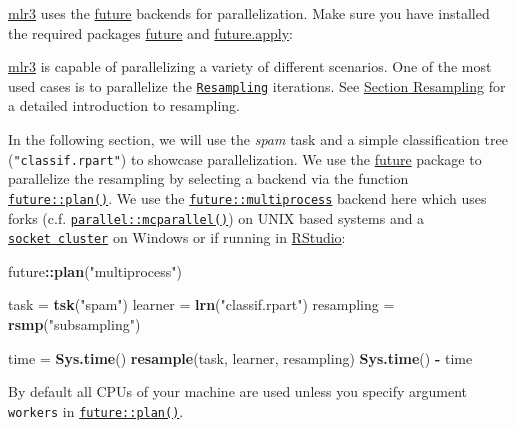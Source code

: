 \documentclass[]{scrbook}
\newenvironment{Shaded}{\begin{snugshade}}{\end{snugshade}}
\newcommand{\KeywordTok}[1]{\textcolor[rgb]{0.13,0.29,0.53}{\textbf{#1}}}
\newcommand{\NormalTok}[1]{#1}
\newcommand{\OperatorTok}[1]{\textcolor[rgb]{0.81,0.36,0.00}{\textbf{#1}}}
\newcommand{\StringTok}[1]{\textcolor[rgb]{0.31,0.60,0.02}{#1}}
\renewenvironment{Shaded} {\begin{snugshade}\small} {\end{snugshade}}
\begin{document}
\href{https://mlr3.mlr-org.com}{mlr3} uses the \href{https://cran.r-project.org/package=future}{future} backends for parallelization.
Make sure you have installed the required packages \href{https://cran.r-project.org/package=future}{future} and \href{https://cran.r-project.org/package=future.apply}{future.apply}:

\href{https://mlr3.mlr-org.com}{mlr3} is capable of parallelizing a variety of different scenarios.
One of the most used cases is to parallelize the \href{https://mlr3.mlr-org.com/reference/Resampling.html}{\texttt{Resampling}} iterations.
See \protect\hyperlink{resampling}{Section Resampling} for a detailed introduction to resampling.

In the following section, we will use the \emph{spam} task and a simple classification tree (\texttt{"classif.rpart"}) to showcase parallelization.
We use the \href{https://cran.r-project.org/package=future}{future} package to parallelize the resampling by selecting a backend via the function \href{https://www.rdocumentation.org/packages/future/topics/plan}{\texttt{future::plan()}}.
We use the \href{https://www.rdocumentation.org/packages/future/topics/multiprocess}{\texttt{future::multiprocess}} backend here which uses forks (c.f. \href{https://www.rdocumentation.org/packages/parallel/topics/mcparallel}{\texttt{parallel::mcparallel()}}) on UNIX based systems and a \href{https://www.rdocumentation.org/packages/parallel/topics/makePSockCluster}{\texttt{socket\ cluster}} on Windows or if running in \href{https://rstudio.com/}{RStudio}:

\begin{Shaded}
\begin{Highlighting}[]
\NormalTok{future}\OperatorTok{::}\KeywordTok{plan}\NormalTok{(}\StringTok{"multiprocess"}\NormalTok{)}

\NormalTok{task =}\StringTok{ }\KeywordTok{tsk}\NormalTok{(}\StringTok{"spam"}\NormalTok{)}
\NormalTok{learner =}\StringTok{ }\KeywordTok{lrn}\NormalTok{(}\StringTok{"classif.rpart"}\NormalTok{)}
\NormalTok{resampling =}\StringTok{ }\KeywordTok{rsmp}\NormalTok{(}\StringTok{"subsampling"}\NormalTok{)}

\NormalTok{time =}\StringTok{ }\KeywordTok{Sys.time}\NormalTok{()}
\KeywordTok{resample}\NormalTok{(task, learner, resampling)}
\KeywordTok{Sys.time}\NormalTok{() }\OperatorTok{-}\StringTok{ }\NormalTok{time}
\end{Highlighting}
\end{Shaded}

By default all CPUs of your machine are used unless you specify argument \texttt{workers} in \href{https://www.rdocumentation.org/packages/future/topics/plan}{\texttt{future::plan()}}.
\end{document}
